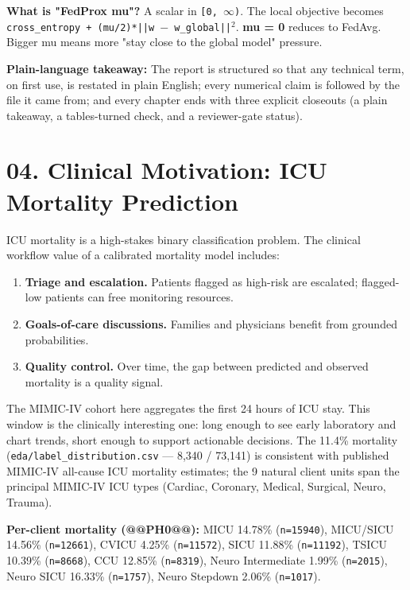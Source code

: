 \documentclass{article}
\begin{document}
\textbf{What is "FedProx mu"?} A scalar in \texttt{[0, \ensuremath{\infty})}. The local objective becomes \texttt{cross\_entropy + (mu/2)*||w \ensuremath{-} w\_global||\ensuremath{^{2}}}. \textbf{mu = 0} reduces to FedAvg. Bigger mu means more "stay close to the global model" pressure.


\textbf{Plain-language takeaway:} The report is structured so that any technical term, on first use, is restated in plain English; every numerical claim is followed by the file it came from; and every chapter ends with three explicit closeouts (a plain takeaway, a tables-turned check, and a reviewer-gate status).



\clearpage
\section{04. Clinical Motivation: ICU Mortality Prediction}


ICU mortality is a high-stakes binary classification problem. The clinical workflow value of a calibrated mortality model includes:


\begin{enumerate}[leftmargin=1.4em,itemsep=2pt,topsep=2pt]
  \item \textbf{Triage and escalation.} Patients flagged as high-risk are escalated; flagged-low patients can free monitoring resources.
  \item \textbf{Goals-of-care discussions.} Families and physicians benefit from grounded probabilities.
  \item \textbf{Quality control.} Over time, the gap between predicted and observed mortality is a quality signal.
\end{enumerate}


The MIMIC-IV cohort here aggregates the first 24 hours of ICU stay. This window is the clinically interesting one: long enough to see early laboratory and chart trends, short enough to support actionable decisions. The 11.4\% mortality (\texttt{eda/label\_distribution.csv} --- 8,340 / 73,141) is consistent with published MIMIC-IV all-cause ICU mortality estimates; the 9 natural client units span the principal MIMIC-IV ICU types (Cardiac, Coronary, Medical, Surgical, Neuro, Trauma).


\textbf{Per-client mortality (@@PH0@@):} MICU 14.78\% (\texttt{n=15940}), MICU/SICU 14.56\% (\texttt{n=12661}), CVICU 4.25\% (\texttt{n=11572}), SICU 11.88\% (\texttt{n=11192}), TSICU 10.39\% (\texttt{n=8668}), CCU 12.85\% (\texttt{n=8319}), Neuro Intermediate 1.99\% (\texttt{n=2015}), Neuro SICU 16.33\% (\texttt{n=1757}), Neuro Stepdown 2.06\% (\texttt{n=1017}).
\end{document}

